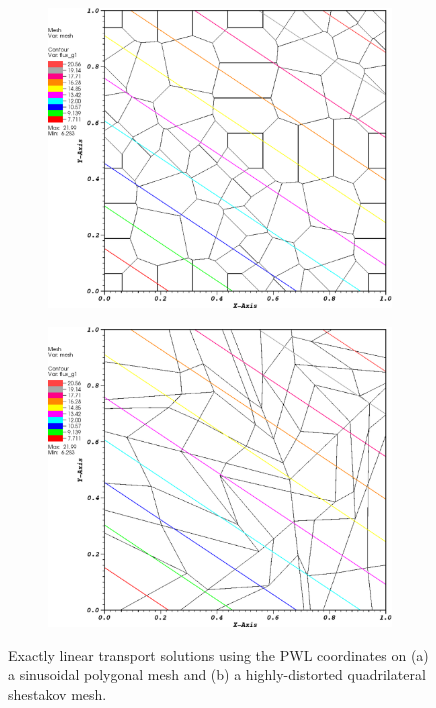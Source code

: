 \documentclass[11pt]{article}
\begin{document}
\vspace{2mm}
\begin{figure}[hbt]
\centering
	\begin{subfigure}[b]{0.42\textwidth}
		\centering
		\includegraphics[width=\textwidth]{figures/smooth_poly_PWLD_k1.eps}
		\caption{}
	\end{subfigure}
	\hfill
	\begin{subfigure}[b]{0.42\textwidth}
		\centering
		\includegraphics[width=\textwidth]{figures/shes_quad_PWLD_k1.eps}
		\caption{}
	\end{subfigure}
\caption{Exactly linear transport solutions using the PWL coordinates on (a) a sinusoidal polygonal mesh and (b) a highly-distorted quadrilateral shestakov mesh.}
\label{fig::lin_sol}
\end{figure}
\vspace{2mm}
\end{document}
